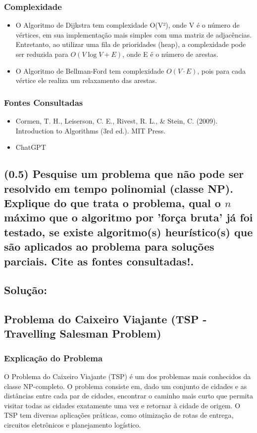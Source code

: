\documentclass{article}
\begin{document}
\subsubsection{Complexidade}
\begin{itemize}
    \item O Algoritmo de Dijkstra tem complexidade O(V²), onde V é o número de 
    vértices, em sua implementação mais simples com uma matriz de adjacências. 
    Entretanto, ao utilizar uma fila de prioridades (heap), a complexidade pode 
    ser reduzida para $O(V \log V + E)$, onde E é o número de arestas.
    \item O Algoritmo de Bellman-Ford tem complexidade $O(V \cdot E)$, pois para 
    cada vértice ele realiza um relaxamento das arestas.
\end{itemize}

\subsubsection{Fontes Consultadas}
\begin{itemize}
    \item Cormen, T. H., Leiserson, C. E., Rivest, R. L., \& Stein, C. (2009). Introduction to Algorithms (3rd ed.). MIT Press.
    \item ChatGPT 
\end{itemize}





\subsection {(0.5) Pesquise um problema que não pode ser resolvido em tempo 
polinomial (classe NP). Explique do que trata o problema, qual o $n$ máximo que o 
algoritmo por 'força bruta' já foi testado, se existe algoritmo(s) heurístico(s) 
que são aplicados ao problema para soluções parciais. Cite as fontes consultadas!.}

\subsection*{Solução:}
\subsection*{Problema do Caixeiro Viajante (TSP - Travelling Salesman Problem)}

\subsubsection{Explicação do Problema}
O Problema do Caixeiro Viajante (TSP) é um dos problemas mais conhecidos da 
classe NP-completo. O problema consiste em, dado um conjunto de cidades e as 
distâncias entre cada par de cidades, encontrar o caminho mais curto que permita 
visitar todas as cidades exatamente uma vez e retornar à cidade de origem. O TSP 
tem diversas aplicações práticas, como otimização de rotas de entrega, circuitos 
eletrônicos e planejamento logístico.
\end{document}
